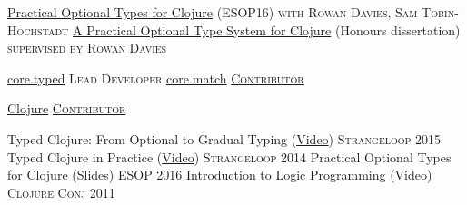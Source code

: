 \documentclass[10pt,a4paper]{article}
\begin{document}
%
%
%

\headedsection
  {\href{http://frenchy64.github.io/papers/esop16-short.pdf}{Practical Optional Types for Clojure}
  (ESOP16)}
  {\textsc{with Rowan Davies, Sam Tobin-Hochstadt}} {%
    {}
}
\headedsection
  {\href{https://s3.amazonaws.com/github/downloads/frenchy64/papers/ambrose-honours.pdf}{A Practical Optional Type System for Clojure} (Honours dissertation)}
  {\textsc{supervised by Rowan Davies}} {%
    {}
}


%



\headedsection
  {\href{https://github.com/clojure/core.typed}{core.typed}}
  {\textsc{Lead Developer}} {%
    {
    }
}
\headedsection
  {\href{https://github.com/clojure/core.match}{core.match}}
  {\href{https://github.com/clojure/core.match/commits?author=frenchy64}{\textsc{Contributor}}} {%
    {%
    }
}

\headedsection
  {\href{https://github.com/clojure/clojure}{Clojure}}
  {\href{https://github.com/clojure/clojure/commits?author=frenchy64}{\textsc{Contributor}}} {%
    {%
    }
}


\headedsection
  {Typed Clojure: From Optional to Gradual Typing (\href{https://www.youtube.com/watch?v=yG9CffLlXx0}{Video})}
  {\textsc{Strangeloop 2015}} {%
}
\headedsection
  {Typed Clojure in Practice (\href{https://www.youtube.com/watch?v=a0gT0syAXsY}{Video})}
  {\textsc{Strangeloop 2014}} {%
}
\headedsection
  {Practical Optional Types for Clojure (\href{http://ambrosebs.com/talks/esop16.pdf}{Slides})}
  {\textsc{ESOP 2016}} {%
  }
\headedsection
  {Introduction to Logic Programming (\href{https://www.youtube.com/watch?v=irjP8BO1B8Y}{Video})}
  {\textsc{Clojure Conj 2011}} {%
}
\end{document}
